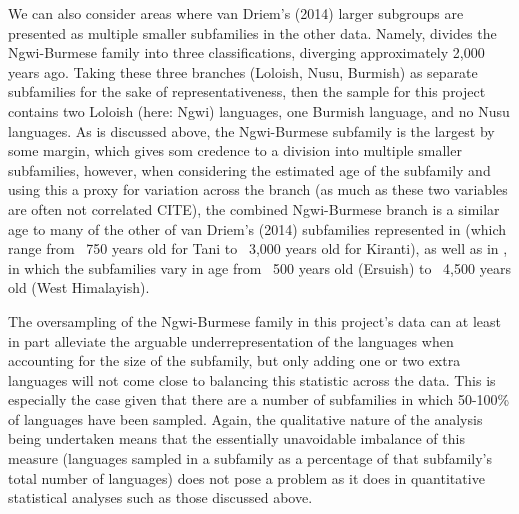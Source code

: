 We can also consider areas where van Driem's (2014) larger subgroups are presented as multiple smaller subfamilies in the other data. Namely,  divides the Ngwi-Burmese family into three classifications, diverging approximately 2,000 years ago. Taking these three branches (Loloish, Nusu, Burmish) as separate subfamilies for the sake of representativeness, then the sample for this project contains two Loloish (here: Ngwi) languages, one Burmish language, and no Nusu languages. As is discussed above, the Ngwi-Burmese subfamily is the largest by some margin, which gives som credence to a division into multiple smaller subfamilies, however, when considering the estimated age of the subfamily and using this a proxy for variation across the branch (as much as these two variables are often not correlated CITE), the combined Ngwi-Burmese branch is a similar age to many of the other of van Driem's (2014) subfamilies represented in  (which range from ~750 years old for Tani to ~3,000 years old for Kiranti), as well as in , in which the subfamilies vary in age from ~500 years old (Ersuish) to ~4,500 years old (West Himalayish).

The oversampling of the Ngwi-Burmese family in this project's data can at least in part alleviate the arguable underrepresentation of the languages when accounting for the size of the subfamily, but only adding one or two extra languages will not come close to balancing this statistic across the data. This is especially the case given that there are a number of subfamilies in which 50-100\% of languages have been sampled. Again, the qualitative nature of the analysis being undertaken means that the essentially unavoidable imbalance of this measure (languages sampled in a subfamily as a percentage of that subfamily's total number of languages) does not pose a problem as it does in quantitative statistical analyses such as those discussed above.

